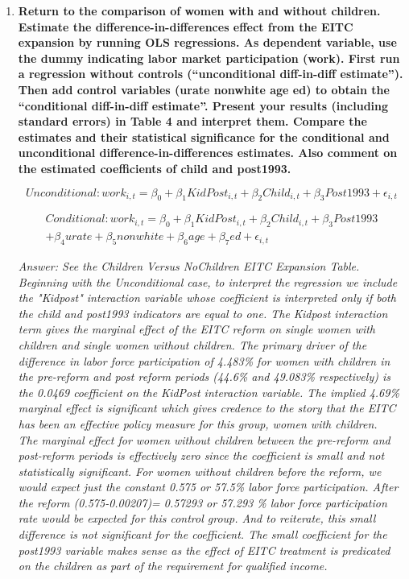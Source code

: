 \documentclass{article}
\begin{document}
\begin{enumerate}
\item \textbf{ Return to the comparison of women with and without children. Estimate the difference-in-differences effect from the EITC expansion by running OLS regressions. As dependent variable, use the dummy indicating labor market participation (work). First run a regression without controls (“unconditional diff-in-diff estimate”). Then add control variables (urate nonwhite age ed) to obtain the “conditional diff-in-diff estimate”. Present your results (including standard errors) in Table 4 and interpret them. Compare the estimates and their statistical significance for the conditional and unconditional difference-in-differences estimates. Also comment on the estimated coefficients of child and post1993.  }


\begin{equation}
Unconditional: work_{i,t}= \beta_{0} + \beta_{1} KidPost_{i,t} + \beta_{2} Child_{i,t} +\beta_{3} Post1993 + \epsilon_{i,t} 
\end{equation}

\begin{multline}
Conditional: work_{i,t}= \beta_{0} + \beta_{1} KidPost_{i,t} + \beta_{2} Child_{i,t} +\beta_{3} Post1993  \\
+ \beta_{4} urate + \beta_{5} nonwhite + \beta_{6} age + \beta_{7} ed +     \epsilon_{i,t} 
\end{multline}


\textit{Answer: See the Children Versus NoChildren EITC Expansion Table. Beginning with the Unconditional case, to interpret the regression we include the "Kidpost" interaction variable whose coefficient is interpreted only if both the child and post1993 indicators are equal to one. The Kidpost interaction term gives the marginal effect of the EITC reform on single women with children and single women without children. The primary driver of the difference in labor force participation of 4.483\% for women with children in the pre-reform and post reform periods (44.6\% and 49.083\% respectively) is the 0.0469 coefficient on the KidPost interaction variable. The implied 4.69\% marginal effect is significant which gives credence to the story that the EITC has been an effective policy measure for this group, women with children.} \\

\textit{The marginal effect for women without children between the pre-reform and post-reform periods is effectively zero since the coefficient is small and not statistically significant. For women without children before the reform, we would expect just the constant 0.575 or 57.5\% labor force participation. After the reform (0.575-0.00207)= 0.57293 or 57.293 \% labor force participation rate would be expected for this control group. And to reiterate, this small difference is not significant for the coefficient. The small coefficient for the post1993 variable makes sense as the effect of EITC treatment is predicated on the children as part of the requirement for qualified income. }\\





\end{enumerate}
\end{document}

